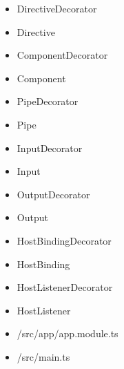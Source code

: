 \begin{itemize}
  \item DirectiveDecorator
  \item Directive
  \item ComponentDecorator
  \item Component
  \item PipeDecorator
  \item Pipe
  \item InputDecorator
  \item Input
  \item OutputDecorator
  \item Output
  \item HostBindingDecorator
  \item HostBinding
  \item HostListenerDecorator
  \item HostListener
\end{itemize}












\begin{itemize}
  \item <my-project>/src/app/app.module.ts
\end{itemize}





\begin{itemize}
  \item <my-project>/src/main.ts
\end{itemize}



